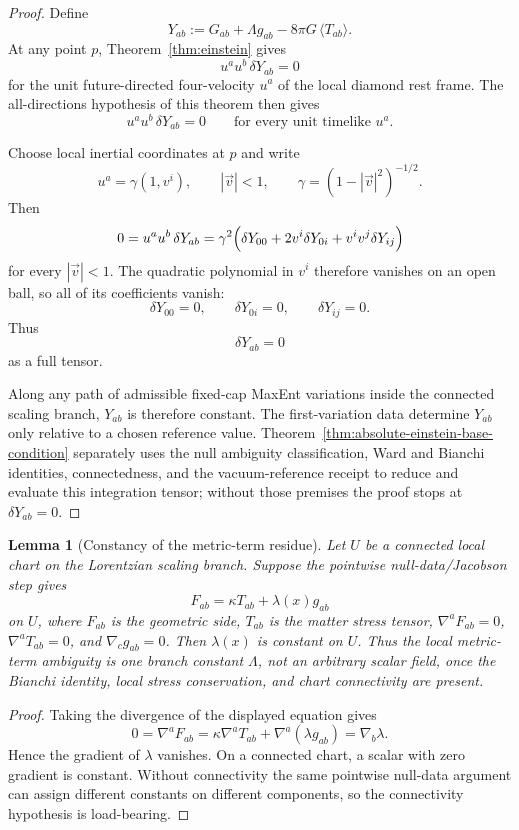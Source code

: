 \documentclass[11pt]{article}
\newtheorem{lemma}[theorem]{Lemma}
\begin{document}
\begin{proof}
Define
\[
Y_{ab}:=G_{ab}+\Lambda g_{ab}-8\pi G\,\langle T_{ab}\rangle.
\]
At any point $p$, Theorem~\ref{thm:einstein} gives
\[
u^a u^b\,\delta Y_{ab}=0
\]
for the unit future-directed four-velocity $u^a$ of the local diamond rest
frame. The all-directions hypothesis of this theorem then gives
\[
u^a u^b\,\delta Y_{ab}=0
\qquad
\text{for every unit timelike }u^a.
\]

Choose local inertial coordinates at $p$ and write
\[
u^a=\gamma(1,v^i),
\qquad
|\vec v|<1,
\qquad
\gamma=(1-|\vec v|^2)^{-1/2}.
\]
Then
\[
0=u^a u^b\,\delta Y_{ab}
=
\gamma^2\Bigl(\delta Y_{00}+2v^i\delta Y_{0i}+v^iv^j\delta Y_{ij}\Bigr)
\]
for every $|\vec v|<1$. The quadratic polynomial in $v^i$ therefore vanishes on an open ball, so all of its coefficients vanish:
\[
\delta Y_{00}=0,\qquad
\delta Y_{0i}=0,\qquad
\delta Y_{ij}=0.
\]
Thus
\[
\delta Y_{ab}=0
\]
as a full tensor.

Along any path of admissible fixed-cap MaxEnt variations inside the connected
scaling branch, \(Y_{ab}\) is therefore constant. The first-variation data
determine \(Y_{ab}\) only relative to a chosen reference value.
Theorem~\ref{thm:absolute-einstein-base-condition} separately uses the null
ambiguity classification, Ward and Bianchi identities, connectedness, and the
vacuum-reference receipt to reduce and evaluate this integration tensor;
without those premises the proof stops at \(\delta Y_{ab}=0\).
\end{proof}

\begin{lemma}[Constancy of the metric-term residue]\label{lem:lambda-constancy}
Let \(U\) be a connected local chart on the Lorentzian scaling branch. Suppose
the pointwise null-data/Jacobson step gives
\[
F_{ab}=\kappa T_{ab}+\lambda(x)g_{ab}
\]
on \(U\), where \(F_{ab}\) is the geometric side, \(T_{ab}\) is the matter
stress tensor, \(\nabla^aF_{ab}=0\), \(\nabla^aT_{ab}=0\), and
\(\nabla_cg_{ab}=0\). Then \(\lambda(x)\) is constant on \(U\). Thus the
local metric-term ambiguity is one branch constant \(\Lambda\), not an
arbitrary scalar field, once the Bianchi identity, local stress conservation,
and chart connectivity are present.
\end{lemma}

\begin{proof}
Taking the divergence of the displayed equation gives
\[
0=\nabla^aF_{ab}
=\kappa\nabla^aT_{ab}+\nabla^a(\lambda g_{ab})
=\nabla_b\lambda.
\]
Hence the gradient of \(\lambda\) vanishes. On a connected chart, a scalar with
zero gradient is constant. Without connectivity the same pointwise null-data
argument can assign different constants on different components, so the
connectivity hypothesis is load-bearing.
\end{proof}
\end{document}
